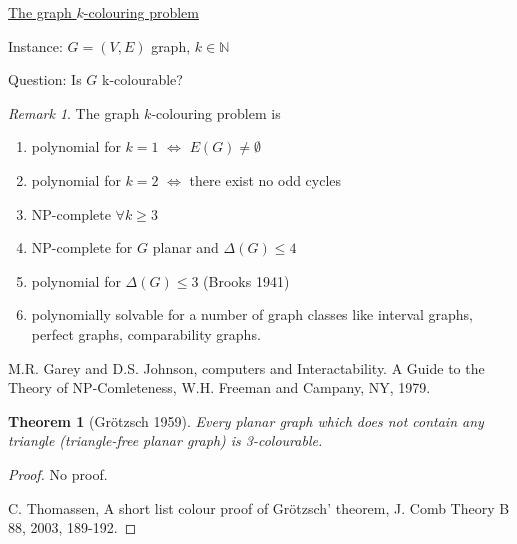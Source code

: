 \documentclass[a4paper]{article}
\theoremstyle{definition}\newtheorem*{defi*}{Definition}
\theoremstyle{remark}\newtheorem*{rem}{Remark}
\theoremstyle{plain}\newtheorem{lemma}[cnt]{Lemma}
\theoremstyle{definition}\newtheorem*{ex}{Example}
\theoremstyle{definition}\newtheorem*{exs}{Examples}
\theoremstyle{plain}\newtheorem{theorem}[cnt]{Theorem}
\theoremstyle{plain}\newtheorem{prop}[cnt]{Proposition}
\theoremstyle{plain}\newtheorem*{cor*}{Corollary}
\theoremstyle{definition}\newtheorem{nota}{Notation}
\theoremstyle{definition}\newtheorem*{nota*}{Notation}
\theoremstyle{plain}\newtheorem{conj}[cnt]{Conjecture}
\newcommand{\N}{\mathbb{N}}
\begin{document}
\underline{The graph $k$-colouring problem} 

Instance: $G= (V,E)$ graph, $k \in \N$

Question: Is $G$ k-colourable?

\begin{rem}
  The graph $k$-colouring problem is
  \begin{enumerate}
    \item polynomial for $k=1$ $\iff$ $E(G) \neq \emptyset$
    \item polynomial for $k=2$ $\iff$ there exist no odd cycles
    \item NP-complete $\forall k \geq 3$
    \item NP-complete for $G$ planar and $\Delta(G) \leq 4$
    \item polynomial for $\Delta(G) \leq 3$ (Brooks 1941)
    \item polynomially solvable for a number of graph classes like interval graphs, perfect graphs, comparability graphs.
  \end{enumerate}

  M.R. Garey and D.S. Johnson, computers and Interactability. A Guide to the Theory of NP-Comleteness, W.H. Freeman and Campany, NY, 1979.
\end{rem}


\begin{theorem}[Grötzsch 1959]
  Every planar graph which does not contain any triangle (triangle-free planar graph) is 3-colourable.
\end{theorem}

\begin{proof}
  No proof.
  
  C. Thomassen, A short list colour proof of Grötzsch' theorem, J. Comb Theory B 88, 2003, 189-192.
\end{proof}













\end{document}
